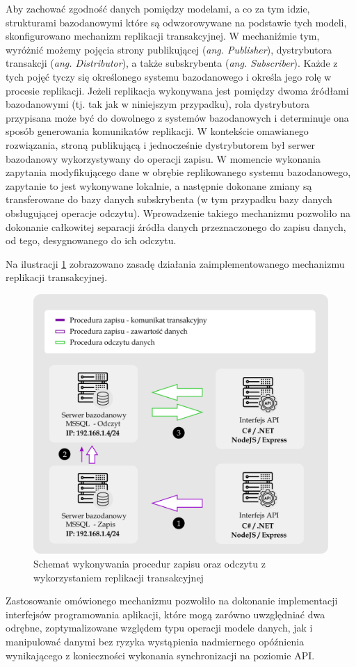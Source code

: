 Aby zachować zgodność danych pomiędzy modelami, a co za tym idzie, strukturami bazodanowymi które są odwzorowywane na podstawie tych modeli, skonfigurowano mechanizm replikacji transakcyjnej. W mechaniźmie tym, wyróżnić możemy pojęcia strony publikującej (\textit{ang. Publisher}), dystrybutora transakcji  (\textit{ang. Distributor}), a także subskrybenta (\textit{ang. Subscriber}). Każde z tych pojęć tyczy się określonego systemu bazodanowego i określa jego rolę w procesie replikacji. Jeżeli replikacja wykonywana jest pomiędzy dwoma źródłami bazodanowymi (tj. tak jak w niniejszym przypadku), rola dystrybutora przypisana może być do dowolnego z systemów bazodanowych i determinuje ona sposób generowania komunikatów replikacji. W kontekście omawianego rozwiązania, stroną publikującą i jednocześnie dystrybutorem był serwer bazodanowy wykorzystywany do operacji zapisu. W momencie wykonania zapytania modyfikującego dane w obrębie replikowanego systemu bazodanowego, zapytanie to jest wykonywane lokalnie, a następnie dokonane zmiany są transferowane do bazy danych subskrybenta (w tym przypadku bazy danych obsługującej operacje odczytu). Wprowadzenie takiego mechanizmu pozwoliło na dokonanie całkowitej separacji źródła danych przeznaczonego do zapisu danych, od tego, desygnowanego do ich odczytu.

Na ilustracji \ref{fig:jak-dziala-replikacja} zobrazowano zasadę działania zaimplementowanego mechanizmu replikacji transakcyjnej.

\begin{figure}[ht]
    \centering
     \includegraphics[width=0.6\linewidth]{rys04/jak_dziala_transakcja.png}
    \caption{Schemat wykonywania procedur zapisu oraz odczytu z wykorzystaniem replikacji transakcyjnej}
    \label{fig:jak-dziala-replikacja}
\end{figure}

Zastosowanie omówionego mechanizmu pozwoliło na dokonanie implementacji interfejsów programowania aplikacji, które mogą zarówno uwzględniać dwa odrębne, zoptymalizowane względem typu operacji modele danych, jak i manipulować danymi bez ryzyka wystąpienia nadmiernego opóźnienia wynikającego z konieczności wykonania synchronizacji na poziomie API.   

